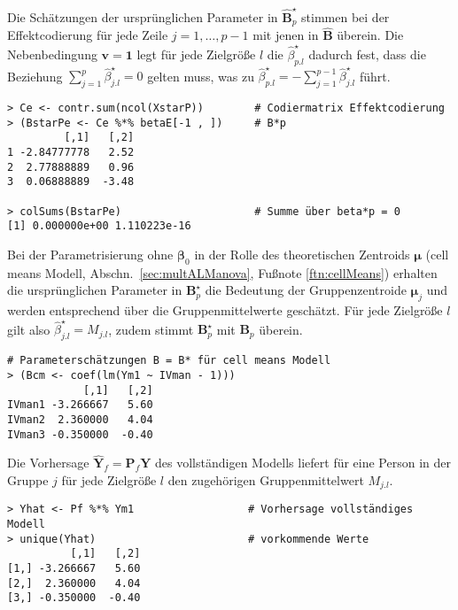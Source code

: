 Die Schätzungen der ursprünglichen Parameter in $\hat{\bm{B}}_{p}^{\star}$ stimmen bei der Effektcodierung für jede Zeile $j = 1, \ldots, p-1$ mit jenen in $\hat{\bm{B}}$ überein. Die Nebenbedingung $\bm{v} = \bm{1}$ legt für jede Zielgröße $l$ die $\hat{\beta}_{p.l}^{\star}$ dadurch fest, dass die Beziehung $\sum_{j=1}^{p} \hat{\beta}_{j.l}^{\star} = 0$ gelten muss, was zu $\hat{\beta}_{p.l}^{\star} = - \sum_{j=1}^{p-1} \hat{\beta}_{j.l}^{\star}$ führt.
\begin{lstlisting}
> Ce <- contr.sum(ncol(XstarP))        # Codiermatrix Effektcodierung
> (BstarPe <- Ce %*% betaE[-1 , ])     # B*p
         [,1]   [,2]
1 -2.84777778   2.52
2  2.77888889   0.96
3  0.06888889  -3.48

> colSums(BstarPe)                     # Summe über beta*p = 0
[1] 0.000000e+00 1.110223e-16
\end{lstlisting}

Bei der Parametrisierung ohne $\bm{\beta}_{0}$ in der Rolle des theoretischen Zentroids $\bm{\mu}$ (cell means Modell, Abschn.\ \ref{sec:multALManova}, Fußnote \ref{ftn:cellMeans}) erhalten die ursprünglichen Parameter in $\bm{B}_{p}^{\star}$ die Bedeutung der Gruppenzentroide $\bm{\mu}_{j}$ und werden entsprechend über die Gruppenmittelwerte geschätzt. Für jede Zielgröße $l$ gilt also $\hat{\beta}_{j.l}^{\star} = M_{j.l}$, zudem stimmt $\bm{B}_{p}^{\star}$ mit $\bm{B}_{p}$ überein.
\begin{lstlisting}
# Parameterschätzungen B = B* für cell means Modell
> (Bcm <- coef(lm(Ym1 ~ IVman - 1)))
            [,1]   [,2]
IVman1 -3.266667   5.60
IVman2  2.360000   4.04
IVman3 -0.350000  -0.40
\end{lstlisting}

Die Vorhersage $\hat{\bm{Y}}_{f} = \bm{P}_{f} \bm{Y}$ des vollständigen Modells liefert für eine Person in der Gruppe $j$ für jede Zielgröße $l$ den zugehörigen Gruppenmittelwert $M_{j.l}$.
\begin{lstlisting}
> Yhat <- Pf %*% Ym1                  # Vorhersage vollständiges Modell
> unique(Yhat)                        # vorkommende Werte
          [,1]   [,2]
[1,] -3.266667   5.60
[2,]  2.360000   4.04
[3,] -0.350000  -0.40
\end{lstlisting}

